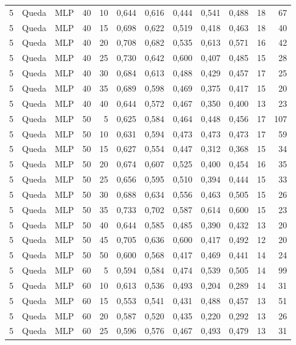 \begin{longtable}{@{}rllrrrrrrrrr@{}}
5 & Queda & MLP & 40 & 10 & 0,644 & 0,616 & 0,444 & 0,541 & 0,488 & 18 & 67 \\
5 & Queda & MLP & 40 & 15 & 0,698 & 0,622 & 0,519 & 0,418 & 0,463 & 18 & 40 \\
5 & Queda & MLP & 40 & 20 & 0,708 & 0,682 & 0,535 & 0,613 & 0,571 & 16 & 42 \\
5 & Queda & MLP & 40 & 25 & 0,730 & 0,642 & 0,600 & 0,407 & 0,485 & 15 & 28 \\
5 & Queda & MLP & 40 & 30 & 0,684 & 0,613 & 0,488 & 0,429 & 0,457 & 17 & 25 \\
5 & Queda & MLP & 40 & 35 & 0,689 & 0,598 & 0,469 & 0,375 & 0,417 & 15 & 20 \\
5 & Queda & MLP & 40 & 40 & 0,644 & 0,572 & 0,467 & 0,350 & 0,400 & 13 & 23 \\
5 & Queda & MLP & 50 & 5 & 0,625 & 0,584 & 0,464 & 0,448 & 0,456 & 17 & 107 \\
5 & Queda & MLP & 50 & 10 & 0,631 & 0,594 & 0,473 & 0,473 & 0,473 & 17 & 59 \\
5 & Queda & MLP & 50 & 15 & 0,627 & 0,554 & 0,447 & 0,312 & 0,368 & 15 & 34 \\
5 & Queda & MLP & 50 & 20 & 0,674 & 0,607 & 0,525 & 0,400 & 0,454 & 16 & 35 \\
5 & Queda & MLP & 50 & 25 & 0,656 & 0,595 & 0,510 & 0,394 & 0,444 & 15 & 33 \\
5 & Queda & MLP & 50 & 30 & 0,688 & 0,634 & 0,556 & 0,463 & 0,505 & 15 & 26 \\
5 & Queda & MLP & 50 & 35 & 0,733 & 0,702 & 0,587 & 0,614 & 0,600 & 15 & 23 \\
5 & Queda & MLP & 50 & 40 & 0,644 & 0,585 & 0,485 & 0,390 & 0,432 & 13 & 20 \\
5 & Queda & MLP & 50 & 45 & 0,705 & 0,636 & 0,600 & 0,417 & 0,492 & 12 & 20 \\
5 & Queda & MLP & 50 & 50 & 0,600 & 0,568 & 0,417 & 0,469 & 0,441 & 14 & 24 \\
5 & Queda & MLP & 60 & 5 & 0,594 & 0,584 & 0,474 & 0,539 & 0,505 & 14 & 99 \\
5 & Queda & MLP & 60 & 10 & 0,613 & 0,536 & 0,493 & 0,204 & 0,289 & 14 & 31 \\
5 & Queda & MLP & 60 & 15 & 0,553 & 0,541 & 0,431 & 0,488 & 0,457 & 13 & 51 \\
5 & Queda & MLP & 60 & 20 & 0,587 & 0,520 & 0,435 & 0,220 & 0,292 & 13 & 26 \\
5 & Queda & MLP & 60 & 25 & 0,596 & 0,576 & 0,467 & 0,493 & 0,479 & 13 & 31 \\

\end{longtable}
